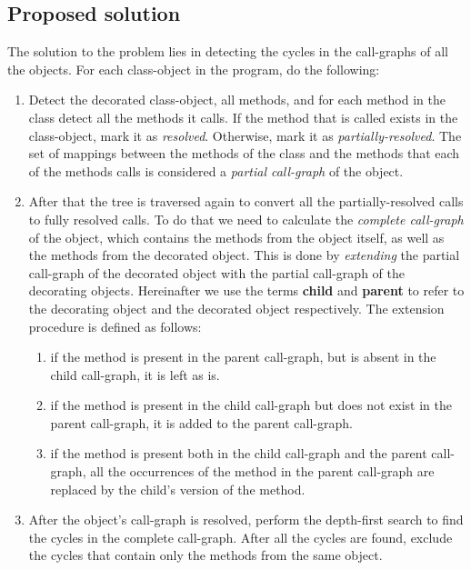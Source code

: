 \subsection{Proposed solution}
The solution to the problem lies in detecting the cycles in the call-graphs of all the objects. For each class-object in the program, do the following:
\begin{enumerate}
    \item Detect the decorated class-object, all methods, and for each method in the class detect all the methods it calls. If the method that is called exists in the class-object, mark it as \textit{resolved}. Otherwise, mark it as \textit{partially-resolved}. The set of mappings between the methods of the class and the methods that each of the methods calls is considered a \textit{partial call-graph} of the object.
    \item After that the tree is traversed again to convert all the partially-resolved calls to fully resolved calls. To do that we need to calculate the \textit{complete call-graph} of the object, which contains the methods from the object itself, as well as the methods from the decorated object. This is done by \textit{extending} the partial call-graph of the decorated object with the partial call-graph of the decorating objects. Hereinafter we use the terms \textbf{child} and \textbf{parent} to refer to the decorating object and the decorated object respectively. The extension procedure is defined as follows: 
    \begin{enumerate}
        \item if the method is present in the parent call-graph, but is absent in the child call-graph, it is left as is. 
        \item if the method is present in the child call-graph but does not exist in the parent call-graph, it is added to the parent call-graph.
        \item if the method is present both in the child call-graph and the parent call-graph, all the occurrences of the method in the parent call-graph are replaced by the child's version of the method.
    \end{enumerate} 
    \item After the object's call-graph is resolved, perform the depth-first search \cite{dfs} to find the cycles in the complete call-graph. After all the cycles are found, exclude the cycles that contain only the methods from the same object. 
\end{enumerate}

